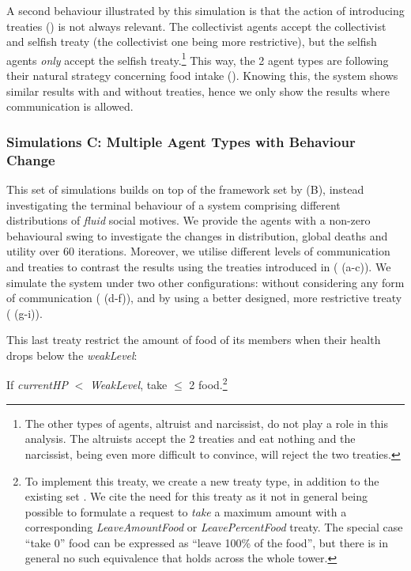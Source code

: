 A second behaviour illustrated by this simulation is that the action of introducing treaties () is not always relevant. The collectivist agents accept the collectivist and selfish treaty (the collectivist one being more restrictive), but the selfish agents \textit{only} accept the selfish treaty.\footnote{The other types of agents, altruist and narcissist, do not play a role in this analysis. The altruists accept the 2 treaties and eat nothing and the narcissist, being even more difficult to convince, will reject the two treaties.} This way, the 2 agent types are following their natural strategy concerning food intake (). Knowing this, the system shows similar results with and without treaties, hence we only show the results where communication is allowed.

\subsubsection{Simulations C: Multiple Agent Types with Behaviour Change}\label{simulation_C}

This set of simulations builds on top of the framework set by (B), instead investigating the terminal behaviour of a system comprising different distributions of \textit{fluid} social motives. We provide the agents with a non-zero behavioural swing to investigate the changes in distribution, global deaths and utility over 60 iterations. Moreover, we utilise different levels of communication and treaties to contrast the results using the treaties introduced in  ( (a-c)). We simulate the system under two other configurations: without considering any form of communication ( (d-f)), and by using a better designed, more restrictive treaty ( (g-i)).

This last treaty restrict the amount of food of its members when their health drops below the \textit{weakLevel}:

If \textit{currentHP} $<$ \textit{WeakLevel}, take $\leq$ 2 food.\footnote{To implement this treaty, we create a new treaty type, in addition to the existing set . We cite the need for this treaty as it not in general being possible to formulate a request to \textit{take} a maximum amount with a corresponding \textit{LeaveAmountFood} or \textit{LeavePercentFood} treaty. The special case ``take 0'' food can be expressed as ``leave 100\% of the food'', but there is in general no such equivalence that holds across the whole tower.}


